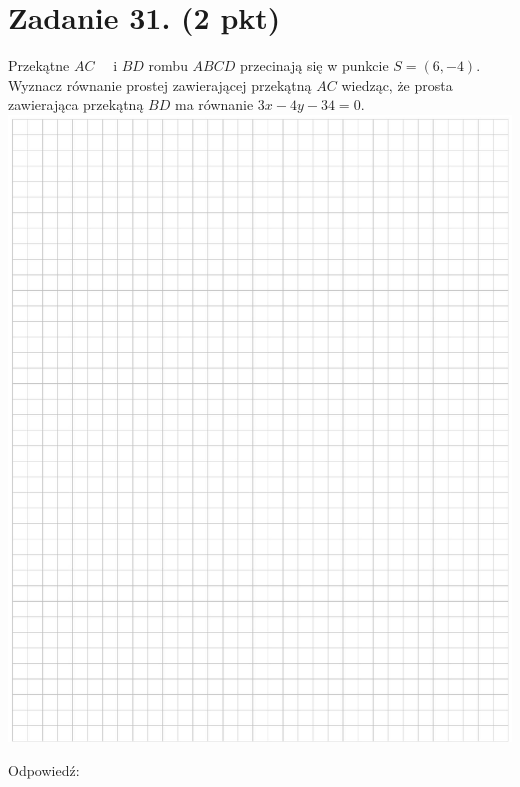 \documentclass[10pt]{article}
\begin{document}
\section*{Zadanie 31. (2 pkt)}
Przekątne \(A C \quad\) i \(B D\) rombu \(A B C D\) przecinają się w punkcie \(S=(6,-4)\). Wyznacz równanie prostej zawierającej przekątną \(A C\) wiedząc, że prosta zawierająca przekątną \(B D\) ma równanie \(3 x-4 y-34=0\).\\
\includegraphics[max width=\textwidth, center]{2024_11_21_b31e6de468170710de69g-14}

Odpowiedź:
\end{document}
